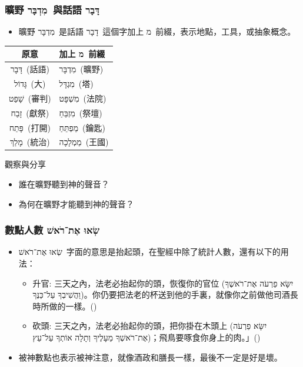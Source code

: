 \documentclass{beamer}
\begin{document}
\begin{frame}
  \frametitle{曠野 \texthebrew{מִדְבָּר}\ 與話語 \texthebrew{דָּבָר}}
  \begin{itemize}
    \item 曠野 \texthebrew{מִדְבָּר}\ 是話語 \texthebrew{דָבָר}\ 這個字加上 \texthebrew{מ}\ 前綴，表示地點，工具，或抽象概念。\par
  \end{itemize}
  \centering
  \begin{tabular}{cl}
    \toprule
    原意 & 加上 \texthebrew{מ}\ 前綴 \\
    \midrule
    \texthebrew{דָּבָר}\ (話語)  & \texthebrew{מִדְבָּר}\ (曠野)  \\
    \texthebrew{גָּדוֹל}\ (大) & \texthebrew{מִגְדָּל}\ (塔) \\
    \texthebrew{שָׁפַט}\ (審判) & \texthebrew{מִשְׁפָּט}\ (法院) \\
    \texthebrew{זָבַח}\ (獻祭) & \texthebrew{מִזְבֵּחַ}\ (祭壇) \\
    \texthebrew{פָּתַח}\ (打開) & \texthebrew{מַפְתֵּחַ}\ (鑰匙) \\
    \texthebrew{מָלַךְ}\ (統治) & \texthebrew{מַמְלָכָה}\ (王國) \\
    \bottomrule
  \end{tabular}
\end{frame}

\begin{frame}{觀察與分享}
  \begin{itemize}
    \item 誰在曠野聽到神的聲音？
    \item 為何在曠野才能聽到神的聲音？
  \end{itemize}
\end{frame}

\begin{frame}
  \frametitle{數點人數 \texthebrew{שְׂאוּ אֶת־רֹאשׁ}}
  \begin{itemize}
    \item \texthebrew{שְׂאוּ אֶת־רֹאשׁ}\ 字面的意思是抬起頭，在聖經中除了統計人數，還有以下的用法：
      \begin{itemize}
        \item 升官: 三天之內，法老必抬起你的頭，恢復你的官位 (\texthebrew{יִשָּׂא פַרְעֹה אֶת־רֹאשֶׁךָ וַהֲשִׁיבְךָ עַל־כַּנֶּךָ})。你仍要把法老的杯送到他的手裏，就像你之前做他司酒長時所做的一樣。()
        \item 砍頭: 三天之內，法老必抬起你的頭，把你掛在木頭上 (\texthebrew{יִשָּׂא פַרְעֹה אֶת־רֹאשְׁךָ מֵעָלֶיךָ וְתָלָה אוֹתְךָ עַל־עֵץ})；飛鳥要啄食你身上的肉。」()
      \end{itemize}
    \item 被神數點也表示被神注意，就像酒政和膳長一樣，最後不一定是好是壞。
  \end{itemize}
\end{frame}
\end{document}
